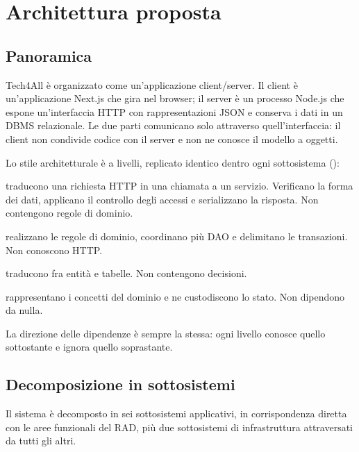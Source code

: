 \chapter{Architettura proposta}
\label{cap:sdd-architettura-proposta}

\section{Panoramica}

Tech4All è organizzato come un'applicazione client/server. Il client è
un'applicazione Next.js che gira nel browser; il server è un processo Node.js
che espone un'interfaccia HTTP con rappresentazioni JSON e conserva i dati in
un DBMS relazionale. Le due parti comunicano solo attraverso quell'interfaccia:
il client non condivide codice con il server e non ne conosce il modello a
oggetti.

Lo stile architetturale è a livelli, replicato identico dentro ogni
sottosistema ():

\begin{description}[leftmargin=1.8cm,style=nextline]
  \item[Rotte] traducono una richiesta HTTP in una chiamata a un servizio.
    Verificano la forma dei dati, applicano il controllo degli accessi e
    serializzano la risposta. Non contengono regole di dominio.
  \item[Servizi] realizzano le regole di dominio, coordinano più DAO e
    delimitano le transazioni. Non conoscono HTTP.
  \item[DAO] traducono fra entità e tabelle. Non contengono decisioni.
  \item[Entità] rappresentano i concetti del dominio e ne custodiscono lo
    stato. Non dipendono da nulla.
\end{description}

La direzione delle dipendenze è sempre la stessa: ogni livello conosce quello
sottostante e ignora quello soprastante.

\section{Decomposizione in sottosistemi}
\label{sec:sdd-sottosistemi}

Il sistema è decomposto in sei sottosistemi applicativi, in corrispondenza
diretta con le aree funzionali del RAD, più due sottosistemi di
infrastruttura attraversati da tutti gli altri.


